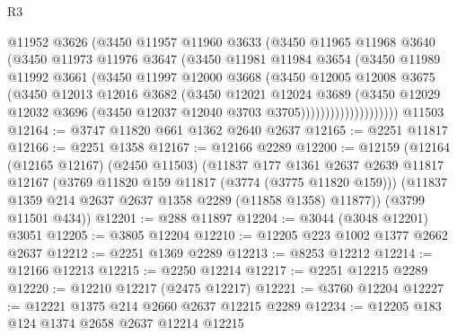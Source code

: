 \begin{lexlean}{R3}
\begin{coremodule}
                      @11952
                      @3626
                      (@3450
                        @11957
                        @11960
                        @3633
                        (@3450
                          @11965
                          @11968
                          @3640
                          (@3450
                            @11973
                            @11976
                            @3647
                            (@3450
                              @11981
                              @11984
                              @3654
                              (@3450
                                @11989
                                @11992
                                @3661
                                (@3450
                                  @11997
                                  @12000
                                  @3668
                                  (@3450
                                    @12005
                                    @12008
                                    @3675
                                    (@3450
                                      @12013
                                      @12016
                                      @3682
                                      (@3450
                                        @12021
                                        @12024
                                        @3689
                                        (@3450
                                          @12029
                                          @12032
                                          @3696
                                          (@3450 @12037 @12040 @3703 @3705))))))))))))))))))))
    @11503
@12164 := @3747 @11820 @661 @1362 @2640 @2637
@12165 := @2251 @11817
@12166 := @2251 @1358
@12167 := @12166 @2289
@12200 := @12159
    (@12164
      (@12165 @12167)
      (@2450 @11503)
      (@11837
        @177
        @1361
        @2637
        @2639
        @11817
        @12167
        (@3769 @11820 @159 @11817 (@3774 (@3775 @11820 @159)))
        (@11837 @1359 @214 @2637 @2637 @1358 @2289 (@11858 @1358) @11877))
      (@3799 @11501 @434))
@12201 := @288 @11897
@12204 := @3044 (@3048 @12201) @3051
@12205 := @3805 @12204
@12210 := @12205 @223 @1002 @1377 @2662 @2637
@12212 := @2251 @1369 @2289
@12213 := @8253 @12212
@12214 := @12166 @12213
@12215 := @2250 @12214
@12217 := @2251 @12215 @2289
@12220 := @12210 @12217 (@2475 @12217)
@12221 := @3760 @12204
@12227 := @12221 @1375 @214 @2660 @2637 @12215 @2289
@12234 := @12205 @183 @124 @1374 @2658 @2637 @12214 @12215

\end{coremodule}
\end{lexlean}

